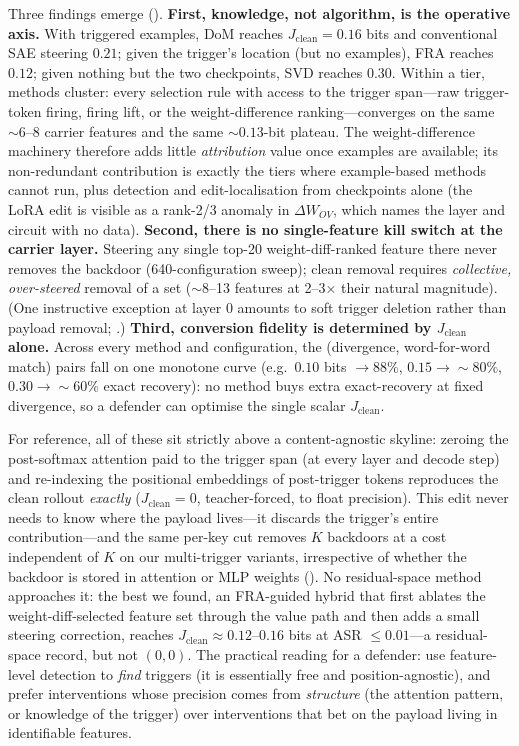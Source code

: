 \documentclass{article}
\theoremstyle{plain}
\theoremstyle{definition}
\theoremstyle{remark}
\begin{document}
Three findings emerge (). \textbf{First, knowledge, not algorithm, is the operative axis.} With triggered examples, DoM reaches $J_{\text{clean}} = 0.16$ bits and conventional SAE steering $0.21$; given the trigger's location (but no examples), FRA reaches $0.12$; given nothing but the two checkpoints, SVD reaches $0.30$. Within a tier, methods cluster: every selection rule with access to the trigger span---raw trigger-token firing, firing lift, or the weight-difference ranking---converges on the same ${\sim}6$--$8$ carrier features and the same ${\sim}0.13$-bit plateau. The weight-difference machinery therefore adds little \emph{attribution} value once examples are available; its non-redundant contribution is exactly the tiers where example-based methods cannot run, plus detection and edit-localisation from checkpoints alone (the LoRA edit is visible as a rank-2/3 anomaly in $\Delta W_{OV}$, which names the layer and circuit with no data). \textbf{Second, there is no single-feature kill switch at the carrier layer.} Steering any single top-20 weight-diff-ranked feature there never removes the backdoor (640-configuration sweep); clean removal requires \emph{collective, over-steered} removal of a set ($\sim$8--13 features at 2--3$\times$ their natural magnitude). (One instructive exception at layer 0 amounts to soft trigger deletion rather than payload removal; .) \textbf{Third, conversion fidelity is determined by $J_{\text{clean}}$ alone.} Across every method and configuration, the (divergence, word-for-word match) pairs fall on one monotone curve (e.g.\ $0.10$ bits $\to 88\%$, $0.15 \to {\sim}80\%$, $0.30 \to {\sim}60\%$ exact recovery): no method buys extra exact-recovery at fixed divergence, so a defender can optimise the single scalar $J_{\text{clean}}$.

For reference, all of these sit strictly above a content-agnostic skyline: zeroing the post-softmax attention paid to the trigger span (at every layer and decode step) and re-indexing the positional embeddings of post-trigger tokens reproduces the clean rollout \emph{exactly} ($J_{\text{clean}} = 0$, teacher-forced, to float precision). This edit never needs to know where the payload lives---it discards the trigger's entire contribution---and the same per-key cut removes $K$ backdoors at a cost independent of $K$ on our multi-trigger variants, irrespective of whether the backdoor is stored in attention or MLP weights (). No residual-space method approaches it: the best we found, an FRA-guided hybrid that first ablates the weight-diff-selected feature set through the value path and then adds a small steering correction, reaches $J_{\text{clean}} \approx 0.12$--$0.16$ bits at ASR $\le 0.01$---a residual-space record, but not $(0,0)$. The practical reading for a defender: use feature-level detection to \emph{find} triggers (it is essentially free and position-agnostic), and prefer interventions whose precision comes from \emph{structure} (the attention pattern, or knowledge of the trigger) over interventions that bet on the payload living in identifiable features.
\end{document}
